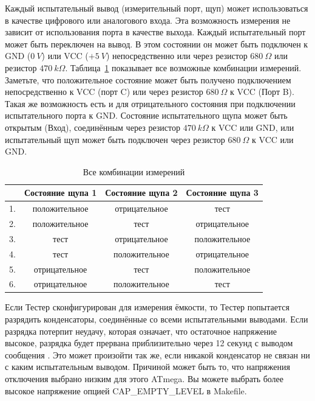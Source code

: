 Каждый испытательный вывод (измерительный порт, щуп) может использоваться в качестве цифрового или аналогового 
входа. Эта возможность измерения не зависит от использования порта в качестве выхода. Каждый испытательный порт 
может быть переключен на вывод. В этом состоянии он может быть подключен к GND (\(0~V\)) или VCC (\(+5~V\)) 
непосредственно или через резистор \(680~\Omega\) или резистор \(470~k\Omega\).
Таблица~\ref{tab:case} показывает все возможные комбинации измерений. Заметьте, что положительное состояние может 
быть получено подключением непосредственно к VCC (порт C) или через резистор \(680~\Omega\) к VCC (Порт B). Такая 
же возможность есть и для отрицательного состояния при подключении испытательного порта к GND. Состояние 
испытательного щупа может быть открытым (Вход), соединённым через резистор \(470~k\Omega\) к VCC или GND, 
или испытательный щуп может быть подключен через резистор \(680~\Omega\) к VCC или GND.

\begin{table}[H]
  \begin{center}
    \begin{tabular}{| l | c | c | c |}
    \hline
      & Состояние щупа 1 & Состояние щупа 2 & Состояние щупа 3 \\
    \hline
   1. & положительное    &  отрицательное    &  тест \\
   2. & положительное    &  тест       & отрицательное \\
   3. & тест        &  отрицательное    & положительное \\
   4. & тест        &  положительное    & отрицательное \\
   5. & отрицательное     &  тест       & положительное \\
   6. & отрицательное     &  положительное    &  тест  \\
    \hline
    \end{tabular}
  \end{center}
  \caption{Все комбинации измерений}
  \label{tab:case} 
\end{table}

Если Тестер сконфигурирован для измерения ёмкости, то Тестер попытается разрядить конденсаторы, 
соединённые со всеми испытательными выводами. Если разрядка потерпит неудачу, которая означает,
что остаточное напряжение высокое, разрядка будет прервана приблизительно через 12 секунд
с выводом сообщения . Это может произойти так же, если никакой конденсатор не связан ни с каким 
испытательным выводом. 
Причиной может быть то, что напряжения отключения выбрано низким для этого ATmega. Вы можете выбрать более 
высокое напряжение опцией CAP\_EMPTY\_LEVEL в Makefile.
